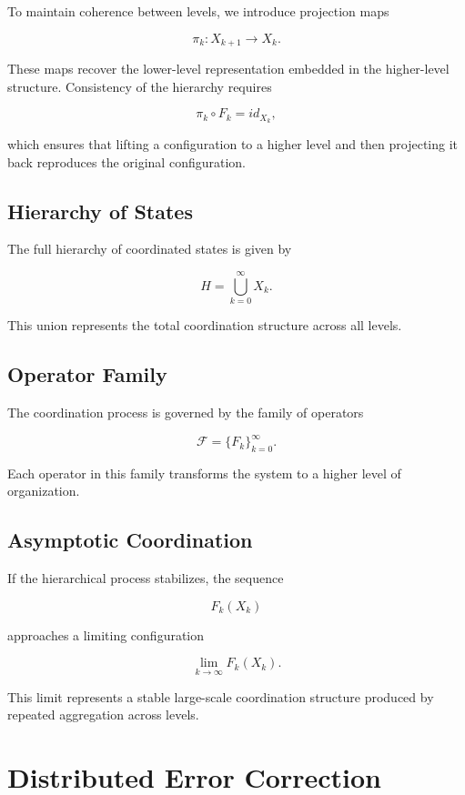 \documentclass[12pt]{article}
\begin{document}
To maintain coherence between levels, we introduce projection maps

\[
\pi_k : X_{k+1} \rightarrow X_k.
\]

These maps recover the lower-level representation embedded in the higher-level structure. Consistency of the hierarchy requires

\[
\pi_k \circ F_k = id_{X_k},
\]

which ensures that lifting a configuration to a higher level and then projecting it back reproduces the original configuration.

\subsection{Hierarchy of States}

The full hierarchy of coordinated states is given by

\[
H = \bigcup_{k=0}^{\infty} X_k .
\]

This union represents the total coordination structure across all levels.

\subsection{Operator Family}

The coordination process is governed by the family of operators

\[
\mathcal{F} = \{F_k\}_{k=0}^{\infty}.
\]

Each operator in this family transforms the system to a higher level of organization.

\subsection{Asymptotic Coordination}

If the hierarchical process stabilizes, the sequence

\[
F_k(X_k)
\]

approaches a limiting configuration

\[
\lim_{k \to \infty} F_k(X_k).
\]

This limit represents a stable large-scale coordination structure produced by repeated aggregation across levels.

\section{Distributed Error Correction}
\end{document}
